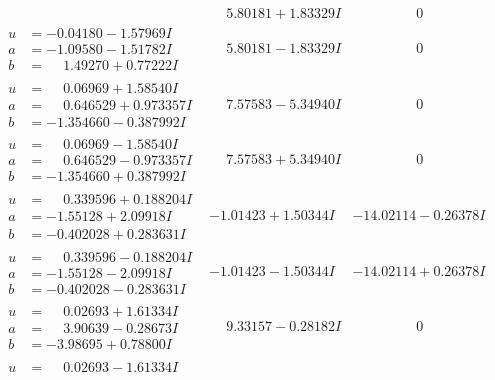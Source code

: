 \documentclass[1p]{elsarticle_modified}
\theoremstyle{definition}
\begin{document}
$$\begin{array}{c|c|c}
 & \phantom{-}5.80181 + 1.83329 I & \phantom{-0.000000 } 0 \\ \hline\begin{aligned}
u &= -0.04180 - 1.57969 I \\
a &= -1.09580 - 1.51782 I \\
b &= \phantom{-}1.49270 + 0.77222 I\end{aligned}
 & \phantom{-}5.80181 - 1.83329 I & \phantom{-0.000000 } 0 \\ \hline\begin{aligned}
u &= \phantom{-}0.06969 + 1.58540 I \\
a &= \phantom{-}0.646529 + 0.973357 I \\
b &= -1.354660 - 0.387992 I\end{aligned}
 & \phantom{-}7.57583 - 5.34940 I & \phantom{-0.000000 } 0 \\ \hline\begin{aligned}
u &= \phantom{-}0.06969 - 1.58540 I \\
a &= \phantom{-}0.646529 - 0.973357 I \\
b &= -1.354660 + 0.387992 I\end{aligned}
 & \phantom{-}7.57583 + 5.34940 I & \phantom{-0.000000 } 0 \\ \hline\begin{aligned}
u &= \phantom{-}0.339596 + 0.188204 I \\
a &= -1.55128 + 2.09918 I \\
b &= -0.402028 + 0.283631 I\end{aligned}
 & -1.01423 + 1.50344 I & -14.02114 - 0.26378 I \\ \hline\begin{aligned}
u &= \phantom{-}0.339596 - 0.188204 I \\
a &= -1.55128 - 2.09918 I \\
b &= -0.402028 - 0.283631 I\end{aligned}
 & -1.01423 - 1.50344 I & -14.02114 + 0.26378 I \\ \hline\begin{aligned}
u &= \phantom{-}0.02693 + 1.61334 I \\
a &= \phantom{-}3.90639 - 0.28673 I \\
b &= -3.98695 + 0.78800 I\end{aligned}
 & \phantom{-}9.33157 - 0.28182 I & \phantom{-0.000000 } 0 \\ \hline\begin{aligned}
u &= \phantom{-}0.02693 - 1.61334 I \\

\end{aligned}
\end{array}$$
\end{document}

